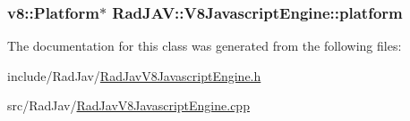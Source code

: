 \subsubsection[{\texorpdfstring{platform}{platform}}]{\setlength{\rightskip}{0pt plus 5cm}v8\+::\+Platform$\ast$ Rad\+J\+A\+V\+::\+V8\+Javascript\+Engine\+::platform\hspace{0.3cm}{\ttfamily [protected]}}\hypertarget{class_rad_j_a_v_1_1_v8_javascript_engine_a6fe5450e6b86a5885af9a3601bcc8ea1}{}\label{class_rad_j_a_v_1_1_v8_javascript_engine_a6fe5450e6b86a5885af9a3601bcc8ea1}


The documentation for this class was generated from the following files\+:\begin{DoxyCompactItemize}
\item 
include/\+Rad\+Jav/\hyperlink{_rad_jav_v8_javascript_engine_8h}{Rad\+Jav\+V8\+Javascript\+Engine.\+h}\item 
src/\+Rad\+Jav/\hyperlink{_rad_jav_v8_javascript_engine_8cpp}{Rad\+Jav\+V8\+Javascript\+Engine.\+cpp}\end{DoxyCompactItemize}
